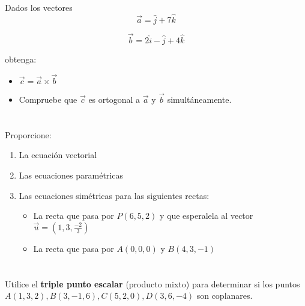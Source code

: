 \documentclass[12pt]{article}
\begin{document}
Dados los vectores \\

\[\vec{a} = \hat{j}+ 7\hat{k}\]

\[\vec{b} = 2\hat{i} - \hat{j}+ 4\hat{k}\]

obtenga:

\begin{itemize}

\item $\vec{c}=\vec{a} \times \vec{b}$

\item Compruebe que $\vec{c}$ es ortogonal a $\vec{a}$ y $\vec{b}$ simultáneamente.

\end{itemize}

\section{}

Proporcione:

\begin{enumerate}

\item La ecuación vectorial

\item Las ecuaciones paramétricas

\item Las ecuaciones simétricas para las siguientes rectas:

  \begin{itemize}

  \item La recta que pasa por $P(6,5,2)$ y que esperalela al vector $\vec{u}=(1,3,\frac{-2}{3})$

  \item La recta que pasa por $A(0,0,0)$ y $B(4,3,-1)$

  \end{itemize}

\end{enumerate}

\section{}

Utilice el \textbf{triple punto escalar} (producto mixto) para determinar si los puntos $A(1,3,2) , B(3,-1,6), C(5,2,0), D(3,6,-4)$ son coplanares.
\end{document}
